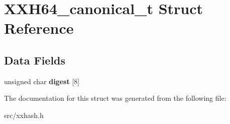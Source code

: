 \hypertarget{structXXH64__canonical__t}{}\section{X\+X\+H64\+\_\+canonical\+\_\+t Struct Reference}
\label{structXXH64__canonical__t}
\subsection*{Data Fields}
\begin{DoxyCompactItemize}
\item 
\mbox{\label{structXXH64__canonical__t_ad62f1c1b20213c45a6686e1e3446c703}} 
unsigned char {\bfseries digest} \mbox{[}8\mbox{]}
\end{DoxyCompactItemize}


The documentation for this struct was generated from the following file\+:\begin{DoxyCompactItemize}
\item 
src/xxhash.\+h\end{DoxyCompactItemize}
